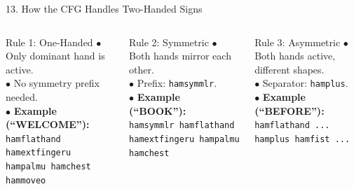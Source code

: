 \documentclass[aspectratio=169]{beamer}
\begin{document}
\begin{frame}[t]{13. How the CFG Handles Two-Handed Signs}

\vspace{2.0mm}
\begin{columns}[T]
    \begin{block}{Rule 1: One-Handed}
        \fontsize{5.8pt}{7.4pt}\selectfont
        $\bullet$ Only dominant hand is active.\\[0.3mm]
        $\bullet$ No symmetry prefix needed.\\[0.3mm]
        $\bullet$ \textbf{Example (``WELCOME''):}\\[0.2mm]
        \texttt{\tiny hamflathand hamextfingeru hampalmu hamchest hammoveo}
    \end{block}

    \begin{block}{Rule 2: Symmetric}
        \fontsize{5.8pt}{7.4pt}\selectfont
        $\bullet$ Both hands mirror each other.\\[0.3mm]
        $\bullet$ Prefix: \texttt{hamsymmlr}.\\[0.3mm]
        $\bullet$ \textbf{Example (``BOOK''):}\\[0.2mm]
        \texttt{\tiny hamsymmlr hamflathand hamextfingeru hampalmu hamchest}
    \end{block}

    \begin{block}{Rule 3: Asymmetric}
        \fontsize{5.8pt}{7.4pt}\selectfont
        $\bullet$ Both hands active, different shapes.\\[0.3mm]
        $\bullet$ Separator: \texttt{hamplus}.\\[0.3mm]
        $\bullet$ \textbf{Example (``BEFORE''):}\\[0.2mm]
        \texttt{\tiny hamflathand ... hamplus hamfist ...}
    \end{block}
\end{columns}


\end{frame}
\end{document}
